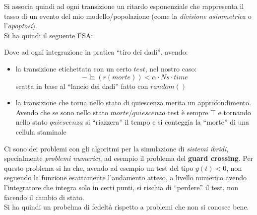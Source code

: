 \documentclass[a4paper,12pt, oneside]{book}
\begin{document}
Si associa quindi ad ogni transizione un ritardo esponenziale che rappresenta il
tasso di un evento del mio modello/popolazione (come la \textit{divisione
  asimmetrica} o l'\textit{apoptosi}).\\
Si ha quindi il seguente FSA:
\begin{figure}[H]
  \centering
  \label{fig:hyb2}
\end{figure}
Dove ad ogni integrazione in pratica ``tiro dei dadi'', avendo:
\begin{itemize}
  \item la transizione etichettata con un certo $test$, nel nostro caso:
  \[-\ln(r(morte))<\alpha\cdot Ns\cdot time\]
  scatta in base al ``lancio dei dadi'' fatto con $random()$
  \item la transizione che torna nello stato di quiescenza merita un
  approfondimento. 
  Avendo che se sono nello stato $morte/quiescenza$ test è sempre $\top$ e
  tornando nello stato $quiescenza$ si ``riazzera'' il tempo e si conteggia la
  ``morte'' di una cellula staminale
\end{itemize}
Ci sono dei problemi con gli algoritmi per la simulazione di \textit{sistemi
  ibridi}, specialmente \textit{problemi numerici}, ad esempio il problema del
\textbf{guard crossing}. Per questo problema si ha che, avendo ad esempio un
test del tipo $y(t)<0$, non seguendo la funzione  esattamente l'andamento
atteso, a livello numerico avendo l'integratore che integra solo in certi punti,
si rischia di ``perdere'' il test, non facendo il cambio di stato.\\
Si ha quindi un probelma di fedeltà rispetto a problemi che non si conosce
bene.
\end{document}
